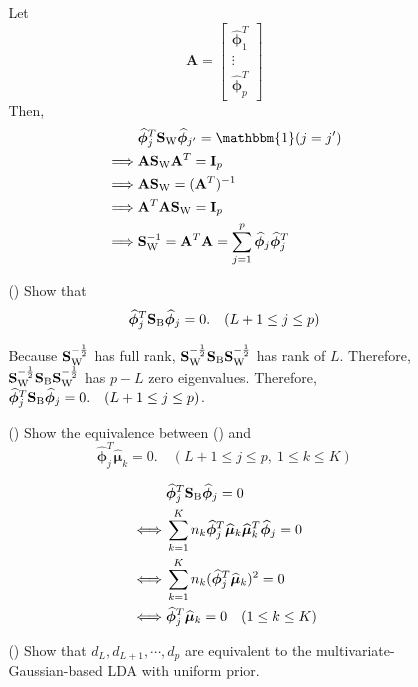 \documentclass[10pt]{article}
\theoremstyle{definition}
\theoremstyle{remark}
\newcommand{\Ab}{\mathbf{A}}
\newcommand{\Ib}{\mathbf{I}}
\newcommand{\Sbb}{\mathbf{S}}
\newcommand{\bmu}{\bm{\mu}}
\newcommand{\bphi}{\bm{\phi}}
\newcommand{\bbone}{{\mathbbm{1}}}	%
\begin{document}
\begin{enumerate}
\begin{itemize}
\begin{itemize}[leftmargin=*]
			Let \[\Ab = \begin{bmatrix} \widehat{\bphi}_{1}^{T} \\ \vdots \\ \widehat{\bphi}_{p}^{T} \end{bmatrix}\]
			Then,
			\begin{align*}
			    & \widehat{\bphi}_{j}^{T}\Sbb_{\rm W}\widehat{\bphi}_{j'} = \bbone(j=j')\\
			    \implies & \Ab\Sbb_{\rm W}\Ab^T = \Ib_p \\
			    \implies & \Ab\Sbb_{\rm W} = (\Ab^T)^{-1} \\
			    \implies & \Ab^T\Ab\Sbb_{\rm W} = \Ib_p \\
			    \implies & \Sbb_{\rm W}^{-1} = \Ab^T\Ab = \sum_{j=1}^{p}\widehat{\bphi}_{j}\widehat{\bphi}_{j}^{T}
			\end{align*}
			
			\item [(\romannum{2})] Show that
			\[ \widehat{\bphi}^{T}_{j}\Sbb_{\rm B}\widehat{\bphi}_{j} = 0. \quad(L+1 \le j \le p) \]
			
			Because $ \Sbb_{\rm W}^{-\frac{1}{2}} $ has full rank, $\Sbb_{\rm W}^{-\frac{1}{2}} \Sbb_{\rm B} \Sbb_{\rm W}^{-\frac{1}{2}} $ has rank of $L$. Therefore, $\Sbb_{\rm W}^{-\frac{1}{2}} \Sbb_{\rm B} \Sbb_{\rm W}^{-\frac{1}{2}} $ has $p-L$ zero eigenvalues. Therefore, $ \widehat{\bphi}^{T}_{j}\Sbb_{\rm B}\widehat{\bphi}_{j} = 0. \quad(L+1 \le j \le p) $.
			
			\item [(\romannum{3})] Show the equivalence between () and
			\[ \widehat{\bphi}_{j}^{T}\widehat{\bmu}_{k} = 0.\quad(L+1 \le j\le p,\ 1 \le k \le K) \]
			
			\begin{align*}
			    & \widehat{\bphi}^{T}_{j}\Sbb_{\rm B}\widehat{\bphi}_{j} = 0 \\
			    \iff & \sum_{k=1}^{K}  n_k\widehat{\bphi}^{T}_{j} \widehat{\bmu}_{k} \widehat{\bmu}_{k}^T \widehat{\bphi}_{j} = 0 \\
			    \iff & \sum_{k=1}^{K}  n_k(\widehat{\bphi}^{T}_{j} \widehat{\bmu}_{k})^2 = 0 \\
			    \iff & \widehat{\bphi}^{T}_{j} \widehat{\bmu}_{k} = 0 \quad (1 \le k \le K)
			\end{align*}
			
			\item [(\romannum{4})] Show that $ d_{L},d_{L+1},\cdots,d_{p} $ are equivalent to the multivariate-Gaussian-based LDA with uniform prior.
			

\end{itemize}
\end{itemize}
\end{enumerate}
\end{document}
